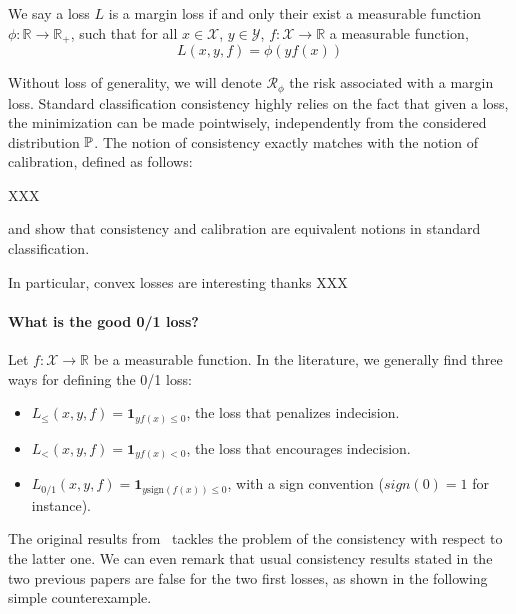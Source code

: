 \begin{definition} We say a loss $L$ is a margin loss if and only their exist a measurable function $\phi:\mathbb{R}\to\mathbb{R}_+$, such that for all $x\in\mathcal{X}$, $y\in\mathcal{Y}$, $f:\mathcal{X}\to\mathbb{R}$ a measurable function,
$$L(x,y,f)=\phi(yf(x))$$
\end{definition}
Without loss of generality, we will denote $\mathcal{R}_\phi$ the risk associated with a margin loss. Standard classification consistency highly relies on the fact that given a loss, the minimization can be made pointwisely, independently from the considered distribution $\mathbb{P}$. The notion of consistency exactly matches with the notion of calibration, defined as follows:
\begin{definition}[Calibration]XXX

\end{definition}

\cite{bartlett2006convexity} and \cite{steinwart2007compare} show that consistency and calibration are equivalent notions in standard classification.

\begin{thm}

\end{thm}

In particular, convex losses are interesting thanks XXX
\paragraph{What is the good 0/1 loss?}

Let $f:\mathcal{X}\to\mathbb{R}$ be a measurable function. In the literature,  we generally find three ways for defining the 0/1 loss:
\begin{itemize}
    \item $L_{\leq}(x,y,f)=\mathbf{1}_{yf(x)\leq 0}$, the loss that penalizes indecision.
    \item $L_{<}(x,y,f)=\mathbf{1}_{yf(x)< 0}$, the loss that encourages indecision.
    \item $L_{0/1}(x,y,f)=\mathbf{1}_{y\text{sign}(f(x))\leq 0}$, with a sign convention ($sign(0) = 1$ for instance).
\end{itemize}

The original results from~\citep{bartlett2006convexity,steinwart2007compare} tackles the problem of the consistency with respect to the latter one. We can even remark that usual consistency results stated in the two previous papers are false for the two first losses, as shown in the following simple counterexample.

